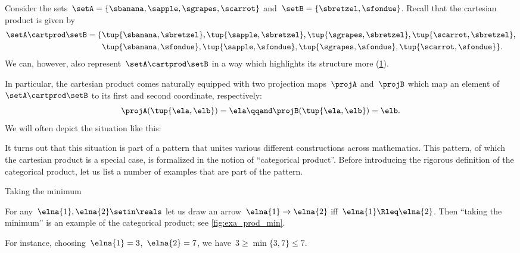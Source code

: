 \begin{example}
    Consider the sets~$\setA = \{\sbanana, \sapple, \sgrapes, \scarrot\}$ and~$\setB = \{ \sbretzel, \sfondue \}$.
    Recall that the cartesian product is given by
    \begin{equation}
        \label{eq:cart-prod-example}
        \begin{aligned}
            \setA \cartprod \setB = \{ & \tup{\sbanana, \sbretzel}, \tup{\sapple, \sbretzel}, \tup{\sgrapes, \sbretzel}, \tup{\scarrot, \sbretzel}, \\
                                       & \tup{\sbanana,\sfondue}, \tup{\sapple, \sfondue}, \tup{\sgrapes, \sfondue}, \tup{\scarrot, \sfondue} \}.
        \end{aligned}
    \end{equation}
    We can, however, also represent~$\setA \cartprod \setB$ in a way which highlights its structure more (\cref{fig:example_cartesian}).
    \begin{figure}[h]
        \centering
        \caption{}
        \label{fig:example_cartesian}
    \end{figure}
    In particular, the cartesian product comes naturally equipped with two projection maps~$\projA$ and~$\projB$ which map an element of~$\setA \cartprod \setB$ to its first and second coordinate, respectively:
    \begin{equation}
        \projA(\tup{\ela,\elb}) =  \ela  \qqand \projB(\tup{\ela,\elb}) = \elb.
    \end{equation}
    We will often depict the situation like this:
\end{example}

It turns out that this situation is part of a pattern that unites various different constructions across mathematics.
This pattern, of which the cartesian product is a special case, is formalized in the notion of ``categorical product''.
Before introducing the rigorous definition of the categorical product, let us list a number of examples that are part of the pattern.

\begin{marginfigure}
    \centering
    \caption{Taking the minimum}
    \label{fig:exa_prod_min}
\end{marginfigure}

\begin{example}
    \label{exa:min-as-prod}
    For any~$\elna{1},\elna{2}\setin \reals$ let us draw an arrow~$\elna{1}\to \elna{2}$ iff~$\elna{1}\Rleq \elna{2}$.
    Then ``taking the minimum'' is an example of the categorical product; see \cref{fig:exa_prod_min}.

    For instance, choosing~$\elna{1} = 3$,~$\elna{2} = 7$, we have~$3 \geq \min \{3, 7\} \leq 7$.
\end{example}

